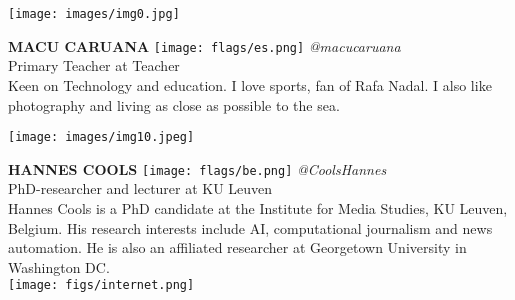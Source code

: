 \noindent
\begin{minipage}{0.3\textwidth}
\centering
\texttt{[image: images/img0.jpg]}
\end{minipage}
\hfill
\begin{minipage}{0.6\textwidth}\raggedright
\color{color1}\uppercase{\textbf{Macu Caruana}}
\color{color2}\hspace{0.2cm}\texttt{[image: flags/es.png]}
\hspace{0.2cm}\textit{@macucaruana}
\\
Primary Teacher at Teacher\\
{\footnotesize Keen on Technology and education. I love sports, fan of Rafa Nadal. I also like photography and living as close as possible to the sea.}\\
\end{minipage}
\newline\newline\newline

\noindent
\begin{minipage}{0.3\textwidth}
\centering
\texttt{[image: images/img10.jpeg]}
\end{minipage}
\hfill
\begin{minipage}{0.6\textwidth}\raggedright
\color{color1}\uppercase{\textbf{Hannes Cools}}
\color{color2}\hspace{0.2cm}\texttt{[image: flags/be.png]}
\hspace{0.2cm}\textit{@CoolsHannes}
\\
PhD-researcher and lecturer at KU Leuven\\
{\footnotesize 
Hannes Cools is a PhD candidate at the Institute for Media Studies, KU Leuven, Belgium. His research interests include AI, computational journalism and news automation. He is also an affiliated researcher at Georgetown University in Washington DC. }\\
\texttt{[image: figs/internet.png]}
\end{minipage}
\newline\newline\newline

